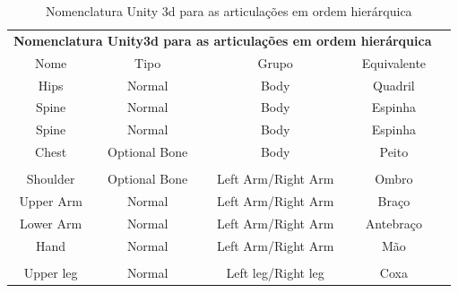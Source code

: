 \begin{table}[]
\centering
\caption{Nomenclatura Unity 3d para as articulações em ordem hierárquica}
\label{nomenclaturaUnity3d}
\begin{tabular}{|c|c|c|c|c}
\cline{1-4}
\multicolumn{4}{|c|}{\cellcolor[HTML]{9B9B9B}\textbf{Nomenclatura Unity3d para as articulações em ordem hierárquica}}             &  \\ \cline{1-4}
\cellcolor[HTML]{C0C0C0}Nome & \cellcolor[HTML]{C0C0C0}Tipo & \cellcolor[HTML]{C0C0C0}Grupo & \cellcolor[HTML]{C0C0C0}Equivalente &  \\ \cline{1-4}
Hips                         & Normal                       & Body                          & Quadril                             &  \\ \cline{1-4}
Spine                        & Normal                       & Body                          & Espinha                             &  \\ \cline{1-4}
Spine                        & Normal                       & Body                          & Espinha                             &  \\ \cline{1-4}
Chest                        & Optional Bone                & Body                          & Peito                               &  \\ \cline{1-4}
                             &                              &                               &                                     &  \\ \cline{1-4}
Shoulder                     & Optional Bone                & Left Arm/Right Arm            & Ombro                               &  \\ \cline{1-4}
Upper Arm                    & Normal                       & Left Arm/Right Arm            & Braço                               &  \\ \cline{1-4}
Lower Arm                    & Normal                       & Left Arm/Right Arm            & Antebraço                           &  \\ \cline{1-4}
Hand                         & Normal                       & Left Arm/Right Arm            & Mão                                 &  \\ \cline{1-4}
                             &                              &                               &                                     &  \\ \cline{1-4}
Upper leg                    & Normal                       & Left leg/Right leg            & Coxa                                &  \\ \cline{1-4}

\end{tabular}
\end{table}
